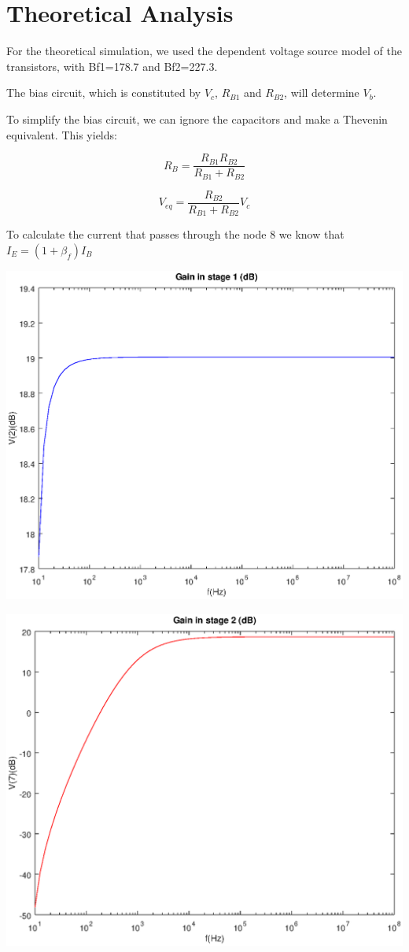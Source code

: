 \section{Theoretical Analysis}
\label{sec:analysis}

For the theoretical simulation, we used the dependent voltage source model of the transistors, with Bf1=178.7 and Bf2=227.3.

The bias circuit, which is constituted by $V_c$, $R_{B1}$ and $R_{B2}$, will determine $V_b$.

To simplify the bias circuit, we can ignore the capacitors and make a Thevenin equivalent. This yields:

\begin{equation}
	R_B=\frac{R_{B1} R_{B2}}{R_{B1}+R_{B2}}
\end{equation}

\begin{equation}
	V_{eq}= \frac{R_{B2}}{R_{B1}+R_{B2}} V_{c}
\end{equation}

To calculate the current that passes through the node 8 we know that $I_E= (1+\beta_f)I_B$

\includegraphics[width=1\linewidth]{vo1.eps}

\includegraphics[width=1\linewidth]{vo2.eps}